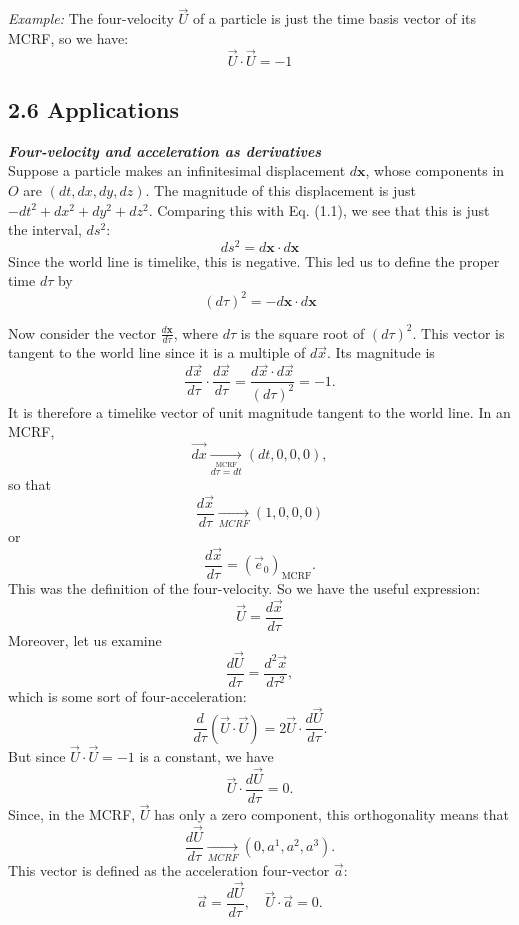 \documentclass[12pt]{book}
\begin{document}
         \textit{Example:} The four-velocity \(\vec{U}\) of a particle is just the time basis vector of its MCRF, so we have:
        \[
            \vec{U}\cdot \vec{U} = -1
        \]
        
        
    \subsection{2.6 Applications }

    \textit{\textbf{Four-velocity and acceleration as derivatives}}\\
    
        Suppose a particle makes an infinitesimal displacement \( d\mathbf{x} \), whose components in \( O \) are \( (dt, dx, dy, dz) \). The magnitude of this displacement is just \( -dt^2 + dx^2 + dy^2 + dz^2 \). Comparing this with Eq. (1.1), we see that this is just the interval, \( ds^2 \):
        \[
        ds^2 = d\mathbf{x} \cdot d\mathbf{x}
        \]
        Since the world line is timelike, this is negative. This led us to define the proper time \( d\tau \) by
        \[
        (d\tau)^2 = -d\mathbf{x} \cdot d\mathbf{x}
        \]
        
        Now consider the vector \( \frac{d\mathbf{x}}{d\tau} \), where \( d\tau \) is the square root of \((d\tau)^2\). This vector is tangent to the world line since it is a multiple of \( d\vec{x} \). Its magnitude is
        \[
        \frac{d\vec{x}}{d\tau} \cdot \frac{d\vec{x}}{d\tau} = \frac{d\vec{x} \cdot d\vec{x}}{(d\tau)^2} = -1.
        \]
        It is therefore a timelike vector of unit magnitude tangent to the world line. In an MCRF,
        \[
        \vec{dx} \underset{\stackrel{\text{MCRF}}{\text{\(d\tau = dt\)}}}{\longrightarrow}(dt, 0, 0, 0),
        \]
        so that
        \[
        \frac{d\vec{x}}{d\tau} \underset{MCRF}{\longrightarrow} (1, 0, 0, 0)
        \]
        or
        \[
        \frac{d\vec{x}}{d\tau} = (\vec{e}_0)_{\text{MCRF}}.
        \]
        This was the definition of the four-velocity. So we have the useful expression:
        \[
        \vec{U} = \frac{d\vec{x}}{d\tau}
        \]
        Moreover, let us examine
        \[
        \frac{d\vec{U}}{d\tau} = \frac{d^2\vec{x}}{d\tau^2},
        \]
        which is some sort of four-acceleration:
        \[
        \frac{d}{d\tau} (\vec{U} \cdot \vec{U}) = 2\vec{U} \cdot \frac{d\vec{U}}{d\tau}.
        \]
        But since \( \vec{U} \cdot \vec{U} = -1 \) is a constant, we have
        \[
        \vec{U} \cdot \frac{d\vec{U}}{d\tau} = 0.
        \]
        Since, in the MCRF, \( \vec{U} \) has only a zero component, this orthogonality means that
        \[
        \frac{d\vec{U}}{d\tau} \underset{MCRF}{\longrightarrow} (0, a^1, a^2, a^3).
        \]
        This vector is defined as the acceleration four-vector \( \vec{a} \):
        \[
        \vec{a} = \frac{d\vec{U}}{d\tau}, \quad \vec{U} \cdot \vec{a} = 0.
        \]
\end{document}
